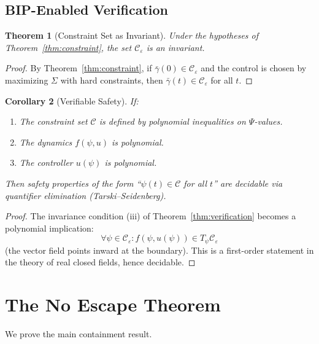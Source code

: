 \documentclass[11pt]{article}
\newtheorem{theorem}{Theorem}[section]
\newtheorem{corollary}[theorem]{Corollary}
\begin{document}
\subsection{BIP-Enabled Verification}

\begin{theorem}[Constraint Set as Invariant]
Under the hypotheses of Theorem~\ref{thm:constraint}, the set $\mathcal{C}_\varepsilon$
is an invariant.
\end{theorem}

\begin{proof}
By Theorem~\ref{thm:constraint}, if $\bar{\gamma}(0) \in \mathcal{C}_\varepsilon$ and the control is chosen by maximizing $\Sigma$ with hard
constraints, then $\bar{\gamma}(t) \in \mathcal{C}_\varepsilon$ for all $t$.
\end{proof}

\begin{corollary}[Verifiable Safety]
If:
\begin{enumerate}
    \item[(i)] The constraint set $\mathcal{C}$ is defined by polynomial inequalities on $\Psi$-values.
    \item[(ii)] The dynamics $f(\psi, u)$ is polynomial.
    \item[(iii)] The controller $u(\psi)$ is polynomial.
\end{enumerate}
Then safety properties of the form ``$\psi(t) \in \mathcal{C}$ for all $t$'' are decidable via quantifier elimination
(Tarski--Seidenberg).
\end{corollary}

\begin{proof}
The invariance condition (iii) of Theorem~\ref{thm:verification} becomes a polynomial implication:
\[
\forall \psi \in \mathcal{C}_\varepsilon : f(\psi, u(\psi)) \in T_\psi \mathcal{C}_\varepsilon
\]
(the vector field points inward at the boundary). This is a first-order statement in the theory
of real closed fields, hence decidable.
\end{proof}

\section{The No Escape Theorem}

We prove the main containment result.
\end{document}
